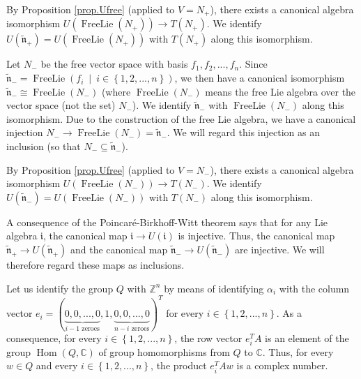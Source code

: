 \documentclass[etingof-lie.tex]{subfiles}
\begin{document}
By Proposition \ref{prop.Ufree} (applied to $V=N_{+}$), there exists a
canonical algebra isomorphism $U\left(  \operatorname*{FreeLie}\left(
N_{+}\right)  \right)  \rightarrow T\left(  N_{+}\right)  $. We identify
$U\left(  \widetilde{\mathfrak{n}}_{+}\right)  =U\left(
\operatorname*{FreeLie}\left(  N_{+}\right)  \right)  $ with $T\left(
N_{+}\right)  $ along this isomorphism.

Let $N_{-}$ be the free vector space with basis $f_{1},f_{2},...,f_{n}$. Since
$\widetilde{\mathfrak{n}}_{-}=\operatorname*{FreeLie}\left(  f_{i}\ \mid
\ i\in\left\{  1,2,...,n\right\}  \right)  $, we then have a canonical
isomorphism $\widetilde{\mathfrak{n}}_{-}\cong\operatorname*{FreeLie}\left(
N_{-}\right)  $ (where $\operatorname*{FreeLie}\left(  N_{-}\right)  $ means
the free Lie algebra over the vector space (not the set) $N_{-}$). We identify
$\widetilde{\mathfrak{n}}_{-}$ with $\operatorname*{FreeLie}\left(
N_{-}\right)  $ along this isomorphism. Due to the construction of the free
Lie algebra, we have a canonical injection $N_{-}\rightarrow
\operatorname*{FreeLie}\left(  N_{-}\right)  =\widetilde{\mathfrak{n}}_{-}$.
We will regard this injection as an inclusion (so that $N_{-}\subseteq
\widetilde{\mathfrak{n}}_{-}$).

By Proposition \ref{prop.Ufree} (applied to $V=N_{-}$), there exists a
canonical algebra isomorphism $U\left(  \operatorname*{FreeLie}\left(
N_{-}\right)  \right)  \rightarrow T\left(  N_{-}\right)  $. We identify
$U\left(  \widetilde{\mathfrak{n}}_{-}\right)  =U\left(
\operatorname*{FreeLie}\left(  N_{-}\right)  \right)  $ with $T\left(
N_{-}\right)  $ along this isomorphism.

A consequence of the Poincar\'{e}-Birkhoff-Witt theorem says that for any Lie
algebra $\mathfrak{i}$, the canonical map $\mathfrak{i}\rightarrow U\left(
\mathfrak{i}\right)  $ is injective. Thus, the canonical map
$\widetilde{\mathfrak{n}}_{+}\rightarrow U\left(  \widetilde{\mathfrak{n}}%
_{+}\right)  $ and the canonical map $\widetilde{\mathfrak{n}}_{-}\rightarrow
U\left(  \widetilde{\mathfrak{n}}_{-}\right)  $ are injective. We will
therefore regard these maps as inclusions.

Let us identify the group $Q$ with $\mathbb{Z}^{n}$ by means of identifying
$\alpha_{i}$ with the column vector $e_{i}=\left(  \underbrace{0,0,...,0}%
_{i-1\text{ zeroes}},1,\underbrace{0,0,...,0}_{n-i\text{ zeroes}}\right)
^{T}$ for every $i\in\left\{  1,2,...,n\right\}  $. As a consequence, for
every $i\in\left\{  1,2,...,n\right\}  $, the row vector $e_{i}^{T}A$ is an
element of the group $\operatorname*{Hom}\left(  Q,\mathbb{C}\right)  $ of
group homomorphisms from $Q$ to $\mathbb{C}$. Thus, for every $w\in Q$ and
every $i\in\left\{  1,2,...,n\right\}  $, the product $e_{i}^{T}Aw$ is a
complex number.
\end{document}
